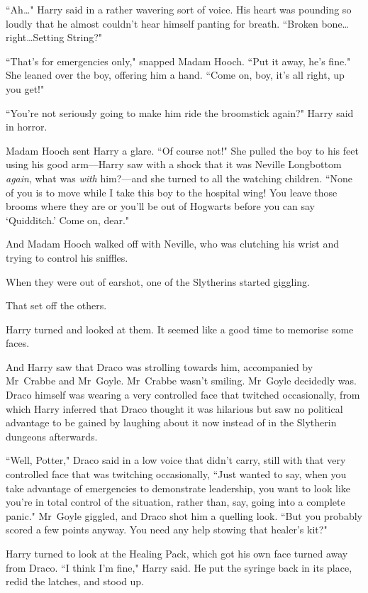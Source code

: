 ``Ah…" Harry said in a rather wavering sort of voice. His heart was pounding so loudly that he almost couldn't hear himself panting for breath. ``Broken bone…right…Setting String?"

``That's for emergencies only," snapped Madam Hooch. ``Put it away, he's fine." She leaned over the boy, offering him a hand. ``Come on, boy, it's all right, up you get!"

``You're not seriously going to make him ride the broomstick again?" Harry said in horror.

Madam Hooch sent Harry a glare. ``Of course not!" She pulled the boy to his feet using his good arm—Harry saw with a shock that it was Neville Longbottom \emph{again}, what was \emph{with} him?—and she turned to all the watching children. ``None of you is to move while I take this boy to the hospital wing! You leave those brooms where they are or you'll be out of Hogwarts before you can say `Quidditch.' Come on, dear."

And Madam Hooch walked off with Neville, who was clutching his wrist and trying to control his sniffles.

When they were out of earshot, one of the Slytherins started giggling.

That set off the others.

Harry turned and looked at them. It seemed like a good time to memorise some faces.

And Harry saw that Draco was strolling towards him, accompanied by Mr~Crabbe and Mr~Goyle. Mr~Crabbe wasn't smiling. Mr~Goyle decidedly was. Draco himself was wearing a very controlled face that twitched occasionally, from which Harry inferred that Draco thought it was hilarious but saw no political advantage to be gained by laughing about it now instead of in the Slytherin dungeons afterwards.

``Well, Potter," Draco said in a low voice that didn't carry, still with that very controlled face that was twitching occasionally, ``Just wanted to say, when you take advantage of emergencies to demonstrate leadership, you want to look like you're in total control of the situation, rather than, say, going into a complete panic." Mr~Goyle giggled, and Draco shot him a quelling look. ``But you probably scored a few points anyway. You need any help stowing that healer's kit?"

Harry turned to look at the Healing Pack, which got his own face turned away from Draco. ``I think I'm fine," Harry said. He put the syringe back in its place, redid the latches, and stood up.

